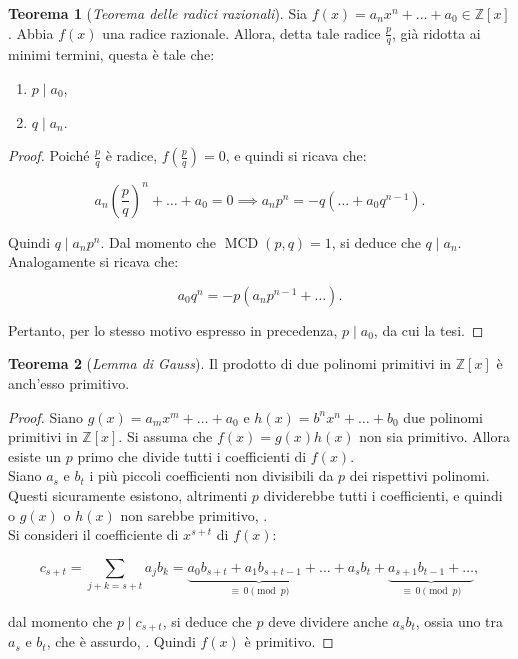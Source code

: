 \documentclass[a4paper]{article}
\newcommand{\ZZx}{\mathbb{Z}[x]}
\theoremstyle{definition}
\newtheorem{theorem}{Teorema}[section]
\DeclareMathOperator{\MCD}{MCD}
\begin{document}
\begin{theorem}[\textit{Teorema delle radici razionali}]
    \label{th:radici_razionali}
    Sia $f(x) = a_n x^n + \ldots + a_0 \in \ZZx$. Abbia $f(x)$
    una radice razionale. Allora, detta tale radice $\frac{p}{q}$,  già ridotta ai minimi termini, questa è tale che:

    \begin{enumerate}[ (i.)]
        \item $p \mid a_0$,
        \item $q \mid a_n$.
    \end{enumerate}
\end{theorem}

\begin{proof}
    Poiché $\frac{p}{q}$ è radice, $f\left(\frac{p}{q}\right)=0$, e
    quindi si ricava che:

    \[ a_n \left( \frac{p}{q} \right)^n + \ldots + a_0 = 0 \implies
        a_n p^n = -q( \ldots + a_0 q^{n-1}). \]

    \vskip 0.1in

    Quindi $q \mid a_n p^n$. Dal momento che $\MCD(p, q)=1$, si
    deduce che $q \mid a_n$. \\

    Analogamente si ricava che:

    \[ a_0 q^n = -p(a_n p^{n-1} + \ldots). \]

    \vskip 0.1in

    Pertanto, per lo stesso motivo espresso in precedenza,
    $p \mid a_0$, da cui la tesi.
\end{proof}

\begin{theorem}[\textit{Lemma di Gauss}]
    \label{th:lemma_gauss}
    Il prodotto di due polinomi primitivi in $\ZZx$ è anch'esso primitivo.
\end{theorem}

\begin{proof}
    Siano $g(x) = a_m x^m + \ldots + a_0$ e $h(x) = b^n x^n + \ldots + b_0$ due polinomi primitivi in $\ZZx$. Si assuma che $f(x)=g(x)h(x)$
    non sia primitivo. Allora esiste un $p$ primo che divide tutti i
    coefficienti di $f(x)$. \\

    Siano $a_s$ e $b_t$ i più piccoli coefficienti non divisibili
    da $p$ dei rispettivi polinomi. Questi sicuramente esistono,
    altrimenti $p$ dividerebbe tutti i coefficienti, e quindi
    o $g(x)$ o $h(x)$ non sarebbe primitivo, \Lightning{}. \\

    Si consideri il coefficiente di $x^{s+t}$ di $f(x)$:

    \[c_{s+t} = \sum_{j+k=s+t} a_j b_k = \underbrace{a_0 b_{s+t} + a_1 b_{s+t-1} + \ldots}_{\equiv \, 0 \pmod p} + a_s b_t + \underbrace{a_{s+1}b_{t-1} + \ldots}_{\equiv \, 0 \pmod p},\]

    dal momento che $p \mid c_{s+t}$, si deduce che $p$ deve dividere
    anche $a_sb_t$, ossia uno tra $a_s$ e $b_t$, che è assurdo, \Lightning{}. Quindi $f(x)$ è primitivo.

\end{proof}
\end{document}
